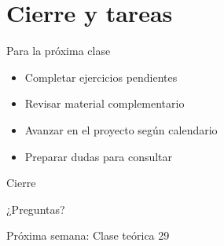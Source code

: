 \documentclass[10pt]{beamer}
\begin{document}
\section{Cierre y tareas}

\begin{frame}{Para la próxima clase}
    \begin{itemize}
        \item Completar ejercicios pendientes
        \item Revisar material complementario
        \item Avanzar en el proyecto según calendario
        \item Preparar dudas para consultar
    \end{itemize}
\end{frame}


\begin{frame}{Cierre}
    \begin{center}
        \Large{¿Preguntas?}
        
        \vspace{1cm}
        
        Próxima semana: Clase teórica 29
    \end{center}
\end{frame}
\end{document}
